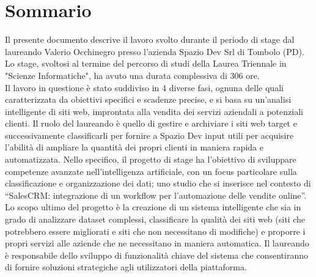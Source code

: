 \cleardoublepage
{}
{}
\begingroup
\let\clearpage\relax
\let\cleardoublepage\relax
\let\cleardoublepage\relax

\chapter*{Sommario}

Il presente documento descrive il lavoro svolto durante il periodo di stage dal laureando
Valerio Occhinegro presso l’azienda Spazio Dev Srl di Tombolo (PD). Lo stage, svoltosi al termine del percorso di studi della Laurea Triennale in "Scienze Informatiche", ha avuto una durata complessiva di 306 ore.\\
Il lavoro in questione è stato suddiviso in 4 diverse fasi, ognuna delle quali caratterizzata da obiettivi specifici e scadenze precise, e si basa su un'analisi intelligente di siti web, improntata alla vendita dei servizi aziendali a potenziali clienti. Il ruolo del laureando è quello di gestire e archiviare i siti web target e successivamente classificarli per fornire a Spazio Dev input utili per acquisire l'abilità di ampliare la quantità dei propri clienti in maniera rapida e automatizzata. 
Nello specifico, il progetto di stage ha l’obiettivo di sviluppare competenze avanzate nell’intelligenza artificiale, con un focus
particolare sulla classificazione e organizzazione dei dati; uno studio che si inserisce nel contesto di
“SalesCRM: integrazione di un workflow per l'automazione delle vendite online”.
Lo scopo ultimo del progetto è la creazione di un sistema intelligente che sia in grado di analizzare dataset complessi,
classificare la qualità dei siti web (siti che potrebbero essere migliorati e siti che non necessitano di modifiche) e proporre i propri servizi alle aziende che ne necessitano in maniera automatica. 
Il laureando è responsabile dello sviluppo di funzionalità chiave del sistema che consentiranno di fornire
soluzioni strategiche agli utilizzatori della piattaforma. 






\endgroup

\vfill

